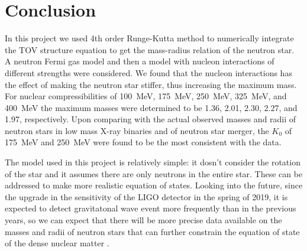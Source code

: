 \documentclass[draft,11pt]{article}
\theoremstyle{definition}
\theoremstyle{remark}
\begin{document}
    \section{Conclusion}
        In this project we used 4th order Runge-Kutta method to numerically integrate the TOV structure equation to get the mass-radius relation of the neutron star. A neutron Fermi gas model and then a model with nucleon interactions of different strengths were considered. We found that the nucleon interactions has the effect of making the neutron star stiffer, thus increasing the maximum mass. For nuclear compressibilities of \SI{100}{\mega\electronvolt}, \SI{175}{\mega\electronvolt}, \SI{250}{\mega\electronvolt}, \SI{325}{\mega\electronvolt}, and \SI{400}{\mega\electronvolt} the maximum masses were determined to be \SI{1.36}{\solarmass}, \SI{2.01}{\solarmass}, \SI{2.30}{\solarmass}, \SI{2.27}{\solarmass}, and \SI{1.97}{\solarmass}, respectively. Upon comparing with the actual observed masses and radii of neutron stars in low mass X-ray binaries and of neutron star merger, the $K_0$ of \SI{175}{\mega\electronvolt} and \SI{250}{\mega\electronvolt} were found to be the most consistent with the data.
        
        The model used in this project is relatively simple: it dosn't consider the rotation of the star and it assumes there are only neutrons in the entire star. These can be addressed to make more realistic equation of states. Looking into the future, since the upgrade in the sensitivity of the LIGO detector in the spring of 2019, it is expected to detect gravitatonal wave event more frequently than in the previous years, so we can expect that there will be more precise data available on the masses  and radii of neutron stars that can further constrain the equation of state of the dense nuclear matter \cite{ligo.update.2019}.
    
    \printbibliography
\end{document}
